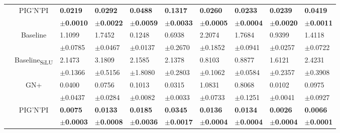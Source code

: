 \documentclass{article}
\newcommand{\pignpi}{PIG'N'PI\xspace}
\newcommand{\lemos}{GN+\xspace}
\begin{document}
\begin{table}[h!]
{\begin{tabularx}{\textwidth}{ccXXXXXXXX}
        &\multirow{2}{*}{\pignpi}
        &\textbf{0.0219} & \textbf{0.0292} & \textbf{0.0488} & \textbf{0.1317} & \textbf{0.0260} & \textbf{0.0233} & \textbf{0.0239} & \textbf{0.0419}\\
        &&\scriptsize\textbf{$\pm$0.0010} & \scriptsize \textbf{$\pm$0.0022} & \scriptsize \textbf{$\pm$0.0059} & \scriptsize \textbf{$\pm$0.0033} & \scriptsize \textbf{$\pm$0.0005} & \scriptsize \textbf{$\pm$0.0004} & \scriptsize \textbf{$\pm$0.0020} & \scriptsize \textbf{$\pm$0.0011}\\
        \hline\rule{0pt}{2.3ex}
        

        \multirow{8}{*}{$\textsf{MAE}_\textsf{symm}^{F}$}
        &\multirow{2}{*}{Baseline}
        &1.1099 & 1.7452 & 0.1248 & 0.6938 & 2.2074 & 1.7684 & 0.9399 & 1.4118\\
        &&\scriptsize$\pm$0.0785 & \scriptsize $\pm$0.0467 & \scriptsize $\pm$0.0137 & \scriptsize $\pm$0.2670 & \scriptsize $\pm$0.1852 & \scriptsize $\pm$0.0941 & \scriptsize $\pm$0.0257 & \scriptsize $\pm$0.0722\\
        \cline{3-10}\rule{0pt}{2.3ex}

        &\multirow{2}{*}{{Baseline\textsubscript{SiLU}}}
        &2.1473 & 3.1809 & 2.1585 & 2.1378 & 0.8103 & 0.8877 & 1.6121 & 2.4231\\
        &&\scriptsize$\pm$0.1366 & \scriptsize $\pm$0.5156 & \scriptsize $\pm$1.8080 & \scriptsize $\pm$0.2803 & \scriptsize $\pm$0.1062 & \scriptsize $\pm$0.0584 & \scriptsize $\pm$0.2357 & \scriptsize $\pm$0.3908\\
        \cline{3-10}\rule{0pt}{2.3ex}
        
        &\multirow{2}{*}{\lemos}
        & 0.0400 & 0.0756 & 0.1013 & 0.0315 & 1.0831 & 0.8068 & 0.0102 & 0.0975\\
        &&\scriptsize$\pm$0.0437&\scriptsize$\pm$0.0284&\scriptsize$\pm$0.0082&\scriptsize$\pm$0.0033&\scriptsize$\pm$0.0733&\scriptsize$\pm$0.1251&\scriptsize$\pm$0.0041&\scriptsize$\pm$0.0927\\
        \cline{3-10}\rule{0pt}{2.3ex}

        &\multirow{2}{*}{\pignpi}
        &\textbf{0.0075} & \textbf{0.0133} & \textbf{0.0185} & \textbf{0.0345} & \textbf{0.0136} & \textbf{0.0134} & \textbf{0.0026} & \textbf{0.0066}\\
        &&\scriptsize\textbf{$\pm$0.0003} & \scriptsize \textbf{$\pm$0.0008} & \scriptsize \textbf{$\pm$0.0036} & \scriptsize \textbf{$\pm$0.0017} & \scriptsize \textbf{$\pm$0.0004} & \scriptsize \textbf{$\pm$0.0004} & \scriptsize \textbf{$\pm$0.0004} & \scriptsize \textbf{$\pm$0.0001}\\

      \bottomrule
\end{tabularx}
}
\end{table}
\end{document}
